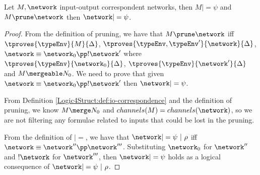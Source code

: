 \begin{proposition} \label{Logic4Struct:prop:preservation:pruning}
  Let $M,\network$ input-output correspondent networks, then  $M |= \psi$ and $M \prune \network$ then $\network |= \psi$.
  \begin{proof}
    From the definition of pruning, we have that $M \prune \network$
    iff $ \tproves{\typeEnv}{M}{\Delta}$, $\tproves{\typeEnv,
      \typeEnv'}{\network}{\Delta}$, $\network \equiv \network_0 \pp
    !\network' $ where $\tproves{\typeEnv}{\network_0}{\Delta}$,
    $\tproves{\typeEnv}{\network'}{\Delta}$ and $M \mergeable N_0$. We need to
    prove that given $\network \equiv \network_0 \pp
    !\network' $ then $\network |= \psi$.

    From Definition \ref{Logic4Struct:def:io-correspondence} and the definition of
    pruning, we know $M \merge N_0$ and $channels(M) =
    channels(\network)$, so we are not filtering any formulae related
    to inputs that could be lost in the pruning. 

    From the definition of $|=$, we have that $\network |= \psi ~|~
    \rho $ iff $\network \equiv \network'' \pp
    \network'''$. Substituting $\network_0$ for $\network''$ and
    $!\network$ for $\network'''$, then $\network |= \psi $ holds as a
    logical consequence of $\network |= \psi ~|~ \rho$.
    \end{proof}
\end{proposition}


